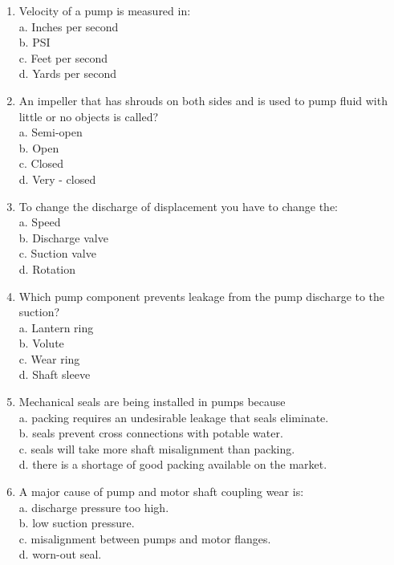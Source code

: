 \documentclass{article}
\begin{document}
\begin{enumerate}[1.]
\item Velocity of a pump is measured in:\\
a.	Inches per second\\
b.	PSI\\
c.	Feet per second\\
d.	Yards per second\\


\item An impeller that has shrouds on both sides and is used to pump fluid with little or no objects is called?\\
a.	Semi-open\\
b.	Open\\
c.	Closed\\
d.	Very - closed
 
\item To change the discharge of displacement you have to change the:\\
a.	Speed\\
b.	Discharge valve\\
c.	Suction valve\\
d.	Rotation

\item Which pump component prevents leakage from the pump discharge to the suction?\\
a.  Lantern ring\\
b.  Volute\\
c.  Wear ring\\
d.  Shaft sleeve

\item Mechanical seals are being installed in pumps because\\
a.	packing requires an undesirable leakage that seals eliminate.\\
b.	seals prevent cross connections with potable water.\\
c.	seals will take more shaft misalignment than packing.\\
d.	there is a shortage of good packing available on the market.\\

\item A major cause of pump and motor shaft coupling wear is:\\
a.	discharge pressure too high.\\
b.	low suction pressure.\\
c.	misalignment between pumps and motor flanges.\\
d.	worn-out seal.


\end{enumerate}
\end{document}
